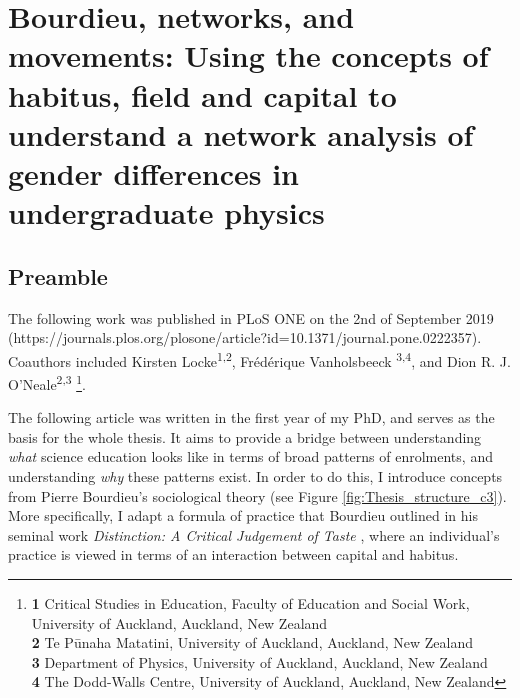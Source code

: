 \chapter[Bourdieu, Networks, and Movements][]{Bourdieu, networks, and movements: Using the concepts of habitus, field and capital to understand a network analysis of gender differences in undergraduate physics}

\section{Preamble}
The following work was published in PLoS ONE on the 2nd of September 2019 (https://journals.plos.org/plosone/article?id=10.1371/journal.pone.0222357). Coauthors included Kirsten Locke\textsuperscript{1,2}, Fr\'ed\'erique Vanholsbeeck \textsuperscript{3,4}, and 
Dion R. J. O'Neale\textsuperscript{2,3}
\footnote{\textbf{1} Critical Studies in Education, Faculty of Education and Social Work, University of Auckland, Auckland, New Zealand
\\
\textbf{2} Te P\={u}naha Matatini, University of Auckland, Auckland, New Zealand
\\
\textbf{3} Department of Physics, University of Auckland, Auckland, New Zealand
\\
\textbf{4} The Dodd-Walls Centre, University of Auckland, Auckland, New Zealand}. 

The following article was written in the first year of my PhD, and serves as the basis for the whole thesis. It aims to provide a bridge between understanding \textit{what} science education looks like in terms of broad patterns of enrolments, and understanding \textit{why} these patterns exist. In order to do this, I introduce concepts from Pierre Bourdieu's sociological theory (see Figure \ref{fig:Thesis_structure_c3}). More specifically, I adapt a formula of practice that Bourdieu outlined in his seminal work \textit{Distinction: A Critical Judgement of Taste} \citep[p.108]{Bourdieu1984}, where an individual's practice is viewed in terms of an interaction between capital and habitus. 


